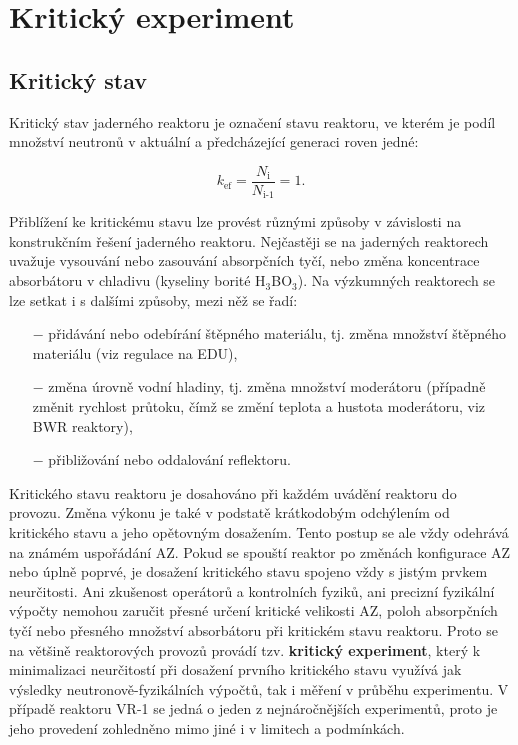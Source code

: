 \section[Kritický experiment]{Kritický experiment}

\subsection{Kritický stav}

Kritický stav jaderného reaktoru je označení stavu reaktoru, ve kterém je podíl množství neutronů v aktuální a předcházející generaci roven jedné: 

\begin{equation}
    \boxed{ k_\text{ef} = \frac{N_\text{i}}{N_\text{i-1}} = 1.}
\end{equation}

Přiblížení ke kritickému stavu lze provést různými způsoby v závislosti na konstrukčním řešení jaderného reaktoru. Nejčastěji se na jaderných reaktorech uvažuje vysouvání nebo zasouvání absorpčních tyčí, nebo změna koncentrace absorbátoru v chladivu (kyseliny borité H$_3$BO$_3$). Na výzkumných reaktorech se lze setkat i s dalšími způsoby, mezi něž se řadí:

\begin{itemize}%
    \item[$-$] přidávání nebo odebírání štěpného materiálu, tj. změna množství štěpného materiálu (viz regulace na EDU),
    \item[$-$] změna úrovně vodní hladiny, tj. změna množství moderátoru (případně změnit rychlost průtoku, čímž se změní teplota a hustota moderátoru, viz BWR reaktory),
    \item[$-$] přibližování nebo oddalování reflektoru.
\end{itemize}

Kritického stavu reaktoru je dosahováno při každém uvádění reaktoru do provozu. Změna výkonu je také v podstatě krátkodobým odchýlením od kritického stavu a jeho opětovným dosažením. Tento postup se ale vždy odehrává na známém uspořádání AZ. Pokud se spouští reaktor po změnách konfigurace AZ nebo úplně poprvé, je dosažení kritického stavu spojeno vždy s jistým prvkem neurčitosti. Ani zkušenost operátorů a kontrolních fyziků, ani precizní fyzikální výpočty nemohou zaručit přesné určení kritické velikosti AZ, poloh absorpčních tyčí nebo přesného množství absorbátoru při kritickém stavu reaktoru. Proto se na většině reaktorových provozů provádí tzv. \textbf{kritický experiment}, který k minimalizaci neurčitostí při dosažení prvního kritického stavu využívá jak výsledky neutronově-fyzikálních výpočtů, tak i měření v průběhu experimentu. V případě reaktoru VR-1 se jedná o jeden z nejnáročnějších experimentů, proto je jeho provedení zohledněno mimo jiné i v limitech a podmínkách.


